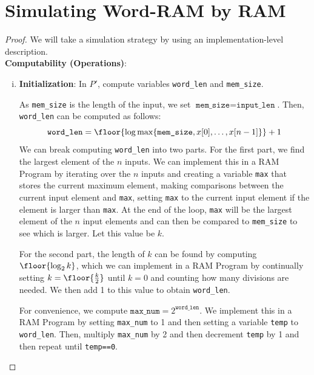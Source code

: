 \documentclass[11pt]{scrartcl}
\theoremstyle{dotlessP}
\theoremstyle{dotlessN}
\DeclarePairedDelimiter\set{\{}{\}}
\begin{document}
\section{Simulating Word-RAM by RAM}
		\begin{proof} We will take a simulation strategy by using an implementation-level description.
			\\

			\textbf{Computability (Operations)}:
			\begin{enumerate}[(i)]
				\item \textbf{Initialization}:
			In $P'$, compute variables \texttt{word\_len} and \texttt{mem\_size}. 

			As \texttt{mem\_size} is the length of the input, we set $\texttt{mem\_size} = \texttt{input\_len}$.  Then, \texttt{word\_len} can be computed as follows:
			\[
				\texttt{word\_len} = \floor{\log \max \set*{\texttt{mem\_size}, x[0], \dots , x[n-1]}} + 1
			\] 
			We can break computing \texttt{word\_len} into two parts. For the first part, we find the largest element of the $n$ inputs. We can implement this in a RAM Program by iterating over the $n$ inputs and creating a variable \texttt{max} that stores the current maximum element, making comparisons between the current input element and \texttt{max}, setting \texttt{max} to the current input element if the element is larger than \texttt{max}. At the end of the loop, \texttt{max} will be the largest element of the $n$ input elements and can then be compared to \texttt{mem\_size} to see which is larger. Let this value be $k$.


			For the second part, the length of $k$ can be found by computing $\floor{\log_2 {k}}$, which we can implement in a RAM Program by continually setting $k = \floor{\frac{k}{2}}$ until  $k = 0$ and counting how many divisions are needed. We then add 1 to this value to obtain \texttt{word\_len}.


			For convenience, we compute $\texttt{max\_num} = 2^{\texttt{word\_len}}$. We implement this in a RAM Program by setting \texttt{max\_num} to 1 and then setting a variable \texttt{temp} to \texttt{word\_len}. Then, multiply \texttt{max\_num} by 2 and then decrement \texttt{temp} by 1 and then repeat until \texttt{temp==0}.


\end{enumerate}
\end{proof}
\end{document}

